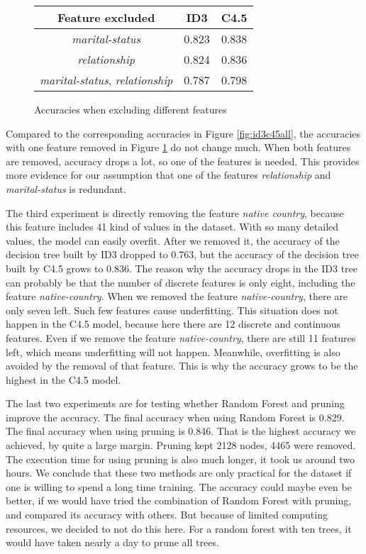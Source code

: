 \documentclass[a4paper]{article}
\begin{document}
\begin{figure}[h]
    \centering
        \begin{tabular}{c|c|c}
        \textbf{Feature excluded} & \textbf{ID3} & \textbf{C4.5} \\
        \hline
        \emph{marital-status} & 0.823 & 0.838 \\
        \emph{relationship} & 0.824 & 0.836 \\
        \emph{marital-status}, \emph{relationship} & 0.787 & 0.798
        \end{tabular}
    \caption{Accuracies when excluding different features}
    \label{fig:id3c45second}
 \end{figure}

Compared to the corresponding accuracies in Figure \ref{fig:id3c45all}, the accuracies with one feature removed in Figure \ref{fig:id3c45second} do not change much. When both features are removed, accuracy drops a lot, so one of the features is needed. This provides more evidence for our assumption that one of the features \emph{relationship} and \emph{marital-status} is redundant.

The third experiment is directly removing the feature \emph{native country}, because this feature includes 41 kind of values in the dataset. With so many detailed values, the model can easily overfit. After we removed it, the accuracy of the decision tree built by ID3 dropped to 0.763, but the accuracy of the decision tree built by C4.5 grows to 0.836. The reason why the accuracy drops in the ID3 tree can probably be that the number of discrete features is only eight, including the feature \emph{native-country}. When we removed the feature \emph{native-country}, there are only seven left. Such few features cause underfitting. This situation does not happen in the C4.5 model, because here there are 12 discrete and continuous features. Even if we remove the feature \emph{native-country}, there are still 11 features left, which means underfitting will not happen. Meanwhile, overfitting is also avoided by the removal of that feature. This is why the accuracy grows to be the highest in the C4.5 model.

The last two experiments are for testing whether Random Forest and pruning improve the accuracy. The final accuracy when using Random Forest is 0.829. The final accuracy when using pruning is 0.846. That is the highest accuracy we achieved, by quite a large margin. Pruning kept 2128 nodes, 4465 were removed. The execution time for using pruning is also much longer, it took us around two hours. We conclude that these two methods are only practical for the dataset if one is willing to spend a long time training. The accuracy could maybe even be better, if we would have tried the combination of Random Forest with pruning, and compared its accuracy with others. But because of limited computing resources, we decided to not do this here. For a random forest with ten trees, it would have taken nearly a day to prune all trees.
\end{document}
